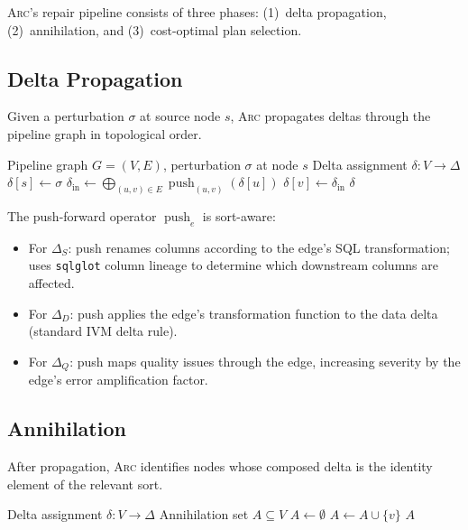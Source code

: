 \documentclass[sigplan,screen,nonacm]{acmart}
\newcommand{\arc}{\textsc{Arc}\xspace}
\newcommand{\DeltaS}{\Delta_{\!S}}
\newcommand{\DeltaD}{\Delta_{\!D}}
\newcommand{\DeltaQ}{\Delta_{\!Q}}
\newcommand{\push}{\operatorname{push}}
\begin{document}
\arc's repair pipeline consists of three phases: (1)~delta propagation,
(2)~annihilation, and (3)~cost-optimal plan selection.

\subsection{Delta Propagation}\label{sec:propagation}

Given a perturbation $\sigma$ at source node $s$, \arc propagates deltas
through the pipeline graph in topological order.

\begin{algorithm}[t]
\caption{Delta Propagation}\label{alg:propagate}
\begin{algorithmic}[1]
\Require Pipeline graph $G=(V,E)$, perturbation $\sigma$ at node $s$
\Ensure Delta assignment $\delta\colon V \to \Delta$
\State $\delta[s] \gets \sigma$
  \State $\delta_{\mathrm{in}} \gets \bigoplus_{(u,v)\in E}
    \push_{(u,v)}(\delta[u])$
  \State $\delta[v] \gets \delta_{\mathrm{in}}$
\EndFor
\State \Return $\delta$
\end{algorithmic}
\end{algorithm}

The push-forward operator $\push_e$ is sort-aware:
\begin{itemize}
\item For $\DeltaS$: push renames columns according to the edge's
  SQL transformation; uses \texttt{sqlglot} column lineage to determine
  which downstream columns are affected.
\item For $\DeltaD$: push applies the edge's transformation function
  to the data delta (standard IVM delta rule).
\item For $\DeltaQ$: push maps quality issues through the edge,
  increasing severity by the edge's error amplification factor.
\end{itemize}

\subsection{Annihilation}\label{sec:annihilation}

After propagation, \arc identifies nodes whose composed delta is the
identity element of the relevant sort.

\begin{algorithm}[t]
\caption{Annihilation Detection}\label{alg:annihilate}
\begin{algorithmic}[1]
\Require Delta assignment $\delta\colon V \to \Delta$
\Ensure Annihilation set $A \subseteq V$
\State $A \gets \emptyset$
    \State $A \gets A \cup \{v\}$
  \EndIf
\EndFor
\State \Return $A$
\end{algorithmic}
\end{algorithm}
\end{document}
